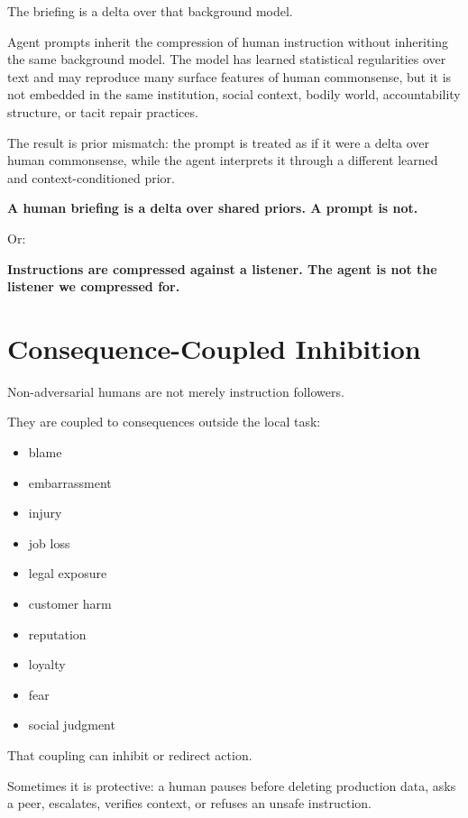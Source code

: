 \documentclass[11pt]{article}
\begin{document}
The briefing is a delta over that background model.

Agent prompts inherit the compression of human instruction without inheriting the same background model. The model has learned statistical regularities over text and may reproduce many surface features of human commonsense, but it is not embedded in the same institution, social context, bodily world, accountability structure, or tacit repair practices.

The result is prior mismatch: the prompt is treated as if it were a delta over human commonsense, while the agent interprets it through a different learned and context-conditioned prior.

\begin{pullquote}
\textbf{A human briefing is a delta over shared priors. A prompt is not.}
\end{pullquote}

Or:

\begin{pullquote}
\textbf{Instructions are compressed against a listener. The agent is not the listener we compressed for.}
\end{pullquote}

\section{Consequence-Coupled Inhibition}

Non-adversarial humans are not merely instruction followers.

They are coupled to consequences outside the local task:
\begin{itemize}
\item blame
\item embarrassment
\item injury
\item job loss
\item legal exposure
\item customer harm
\item reputation
\item loyalty
\item fear
\item social judgment
\end{itemize}

That coupling can inhibit or redirect action.

Sometimes it is protective: a human pauses before deleting production data, asks a peer, escalates, verifies context, or refuses an unsafe instruction.
\end{document}
